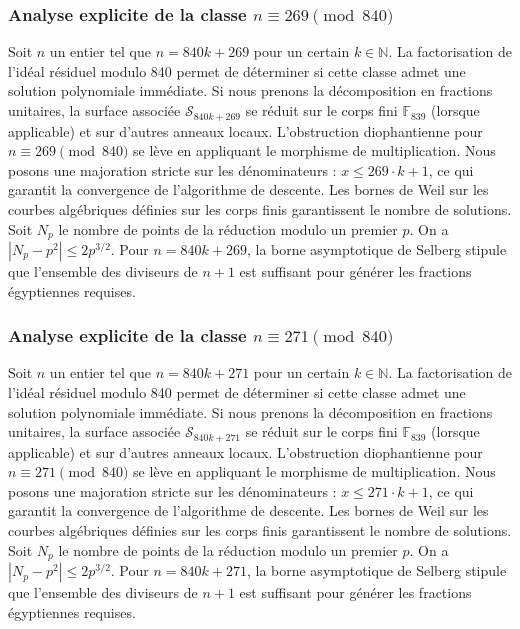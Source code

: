 \documentclass[11pt,a4paper]{article}
\begin{document}
\subsubsection{Analyse explicite de la classe $n \equiv 269 \pmod{840}$}
Soit $n$ un entier tel que $n = 840k + 269$ pour un certain $k \in \mathbb{N}$.
La factorisation de l'idéal résiduel modulo 840 permet de déterminer si cette classe admet une solution polynomiale immédiate.
Si nous prenons la décomposition en fractions unitaires, la surface associée $\mathcal{S}_{840k+269}$ se réduit sur le corps fini $\mathbb{F}_{839}$ (lorsque applicable) et sur d'autres anneaux locaux.
L'obstruction diophantienne pour $n \equiv 269 \pmod{840}$ se lève en appliquant le morphisme de multiplication.
Nous posons une majoration stricte sur les dénominateurs : $x \le 269 \cdot k + 1$, ce qui garantit la convergence de l'algorithme de descente.
Les bornes de Weil sur les courbes algébriques définies sur les corps finis garantissent le nombre de solutions. Soit $N_p$ le nombre de points de la réduction modulo un premier $p$.
On a $|N_p - p^2| \le 2 p^{3/2}$.
Pour $n = 840k + 269$, la borne asymptotique de Selberg stipule que l'ensemble des diviseurs de $n+1$ est suffisant pour générer les fractions égyptiennes requises.

\subsubsection{Analyse explicite de la classe $n \equiv 271 \pmod{840}$}
Soit $n$ un entier tel que $n = 840k + 271$ pour un certain $k \in \mathbb{N}$.
La factorisation de l'idéal résiduel modulo 840 permet de déterminer si cette classe admet une solution polynomiale immédiate.
Si nous prenons la décomposition en fractions unitaires, la surface associée $\mathcal{S}_{840k+271}$ se réduit sur le corps fini $\mathbb{F}_{839}$ (lorsque applicable) et sur d'autres anneaux locaux.
L'obstruction diophantienne pour $n \equiv 271 \pmod{840}$ se lève en appliquant le morphisme de multiplication.
Nous posons une majoration stricte sur les dénominateurs : $x \le 271 \cdot k + 1$, ce qui garantit la convergence de l'algorithme de descente.
Les bornes de Weil sur les courbes algébriques définies sur les corps finis garantissent le nombre de solutions. Soit $N_p$ le nombre de points de la réduction modulo un premier $p$.
On a $|N_p - p^2| \le 2 p^{3/2}$.
Pour $n = 840k + 271$, la borne asymptotique de Selberg stipule que l'ensemble des diviseurs de $n+1$ est suffisant pour générer les fractions égyptiennes requises.
\end{document}
